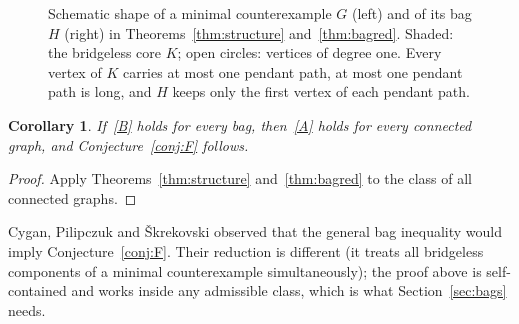 \documentclass[11pt]{amsart}
\newtheorem{corollary}[theorem]{Corollary}
\theoremstyle{definition}
\begin{document}
\begin{figure}[ht]
\centering
{}
\caption{Schematic shape of a minimal counterexample $G$ (left) and of its bag $H$ (right) in
Theorems~\ref{thm:structure} and~\ref{thm:bagred}. Shaded: the bridgeless core $K$; open circles: vertices of degree
one. Every vertex of $K$ carries at most one pendant path, at most one pendant path is long, and $H$ keeps only the first
vertex of each pendant path.}\label{fig:shape}
\end{figure}

\begin{corollary}\label{cor:bagimpliesA}
If~\eqref{B} holds for every bag, then~\eqref{A} holds for every connected graph, and Conjecture~\ref{conj:F} follows.
\end{corollary}

\begin{proof}
Apply Theorems~\ref{thm:structure} and~\ref{thm:bagred} to the class of all connected graphs.
\end{proof}

Cygan, Pilipczuk and \v{S}krekovski observed that the general bag inequality would imply Conjecture~\ref{conj:F}.
Their reduction is different (it treats all bridgeless components of a minimal counterexample simultaneously); the
proof above is self-contained and works inside any admissible class, which is what Section~\ref{sec:bags} needs.
\end{document}
